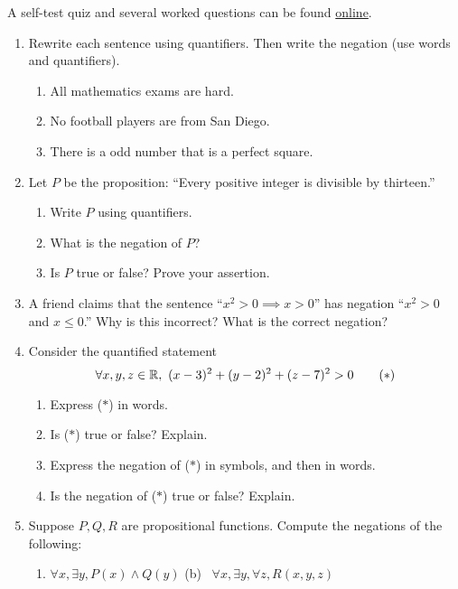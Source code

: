 \begin{exercises}{}{}
	A self-test quiz and several worked questions can be found \href{http://www.math.uci.edu/~ndonalds/math13/selftest/2-2-quants.html}{online}.

	\begin{enumerate}
		\item Rewrite each sentence using quantifiers. Then write the negation (use words and quantifiers).
			\begin{enumerate}
			  \item All mathematics exams are hard.
		  	\item No football players are from San Diego.
		  	\item There is a odd number that is a perfect square.
			\end{enumerate}
			
			
		\item Let $P$ be the proposition: ``Every positive integer is divisible by thirteen.''
	    \begin{enumerate}
	      \item Write $P$ using quantifiers.
	      \item What is the negation of $P$?
	      \item Is $P$ true or false? Prove your assertion.
	    \end{enumerate}
	  
	  
	  \item A friend claims that the sentence ``$x^2>0\implies x>0$'' has negation ``$x^2>0$ and $x\le 0$.'' Why is this incorrect? What is the correct negation?
	  
	
		\item Consider the quantified statement
	    \[\forall x,y,z\in\mathbb{R},\ (x-3)^2+(y-2)^2+(z-7)^2>0 \tag{$\ast$}\]
			\begin{enumerate}
		    \item Express ($\ast$) in words.
		    \item Is ($\ast$) true or false? Explain.
		    \item Express the negation of ($\ast$) in symbols, and then in words.
		    \item Is the negation of ($\ast$) true or false? Explain.
		  \end{enumerate}
	    
	    
	  \item Suppose $P, Q,R$ are propositional functions. Compute the negations of the following:
	  \begin{enumerate}
	    \item $\forall x,\exists y, P(x)\wedge Q(y)$ \qquad\qquad (b) \ $\forall x,\exists y, \forall z,R(x,y,z)$
	  \end{enumerate}
	  

\end{enumerate}
\end{exercises}
